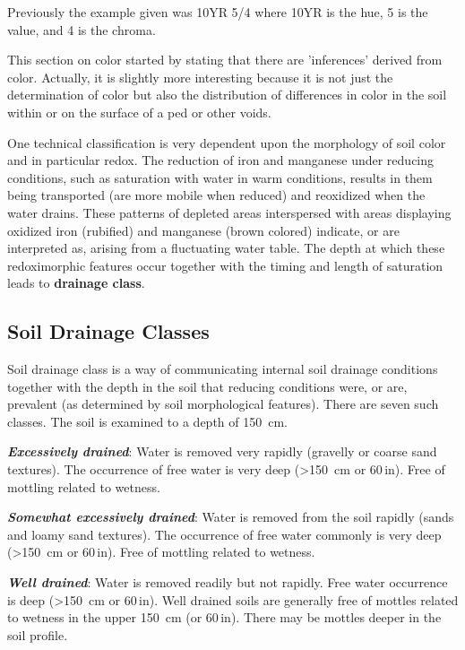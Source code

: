 \documentclass{book}
\begin{document}
Previously the example given was 10YR 5/4 where 10YR is the hue, 5 is the value, and 4 is the chroma.
    
This section on color started by stating that there are 'inferences' derived from color. Actually, it is slightly more interesting because it is not just the determination of color but also the distribution of differences in color in the soil  within or on the surface of a ped or other voids.
 
One technical classification is very dependent upon the morphology of soil color and in particular redox. The reduction of iron and manganese under reducing conditions, such as saturation with water in warm conditions, results in them being  transported (are more mobile when reduced) and reoxidized when the water drains. These patterns of depleted areas interspersed with areas displaying oxidized iron (rubified) and manganese (brown colored) indicate, or are interpreted as, arising from a fluctuating water table. The depth at which these redoximorphic features occur together with the timing and length of saturation leads to \textbf{drainage class}.
 
\subsection{Soil Drainage Classes}
\label{soildrainageclasses}

Soil drainage class is a way of communicating internal soil drainage conditions together with the depth in the soil that reducing conditions were, or are, prevalent (as determined by soil morphological features). There are seven such classes. The soil is examined to a depth of \qty{150}{cm}.

\textbf{\textit{Excessively drained}}: Water is removed very rapidly (gravelly or coarse sand textures). The occurrence of free water is very deep (\textgreater{}\qty{150}{cm} or 60\,in). Free of mottling related to wetness.

\textbf{\textit{Somewhat excessively drained}}: Water is removed from the soil rapidly (sands and loamy sand textures). The occurrence of free water commonly is very deep (\textgreater{}\qty{150}{cm} or 60\,in). Free of mottling related to wetness.

\textbf{\textit{Well drained}}: Water is removed readily but not rapidly. Free water occurrence is deep (\textgreater{}\qty{150}{cm} or 60\,in). Well drained soils are generally free of mottles related to wetness in the upper \qty{150}{cm} (or 60\,in). There may be mottles deeper in the soil profile.
\end{document}
